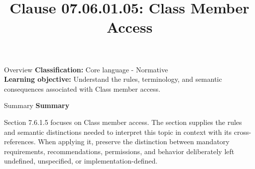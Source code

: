 \documentclass[10pt,letterpaper]{article}
\title{Clause 07.06.01.05: Class Member Access}
\author{}
\date{}
\begin{document}
\maketitle
\begin{CornellOverviewBox}{Overview}
\textbf{Classification:} Core language - Normative\\[2pt]
\textbf{Learning objective:} Understand the rules, terminology, and semantic consequences associated with Class member access.
\end{CornellOverviewBox}\begin{CornellSummaryBox}{Summary}
{\sffamily\bfseries\color{Accent} Summary}\par\vspace{3pt}Section 7.6.1.5 focuses on Class member access. The section supplies the rules and semantic distinctions needed to interpret this topic in context with its cross-references. When applying it, preserve the distinction between mandatory requirements, recommendations, permissions, and behavior deliberately left undefined, unspecified, or implementation-defined.
\end{CornellSummaryBox}
\end{document}
